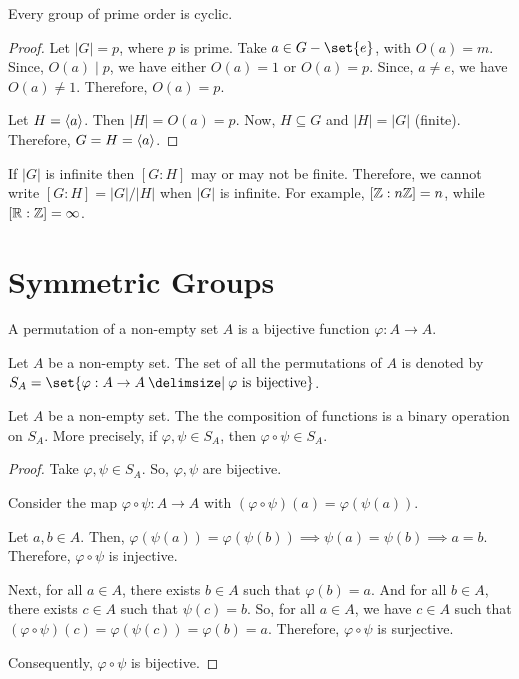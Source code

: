\documentclass[11pt]{penrose}
\begin{document}
\begin{ncor}
    Every group of prime order is cyclic.
\end{ncor}
\begin{proof}
    Let $|G| = p$, where $p$ is prime. Take $a \in G-\set{e}$, with $O(a) = m$. Since, $O(a) \mid p$, we have either $O(a) = 1$ or $O(a) = p$. Since, $a \neq e$, we have $O(a) \neq 1$. Therefore, $O(a) = p$.

    Let $H = \langle a\rangle$. Then $|H| = O(a) = p$. Now, $H \subseteq G$ and $|H| = |G|$ (finite). Therefore, $G = H = \langle a\rangle$.
\end{proof}

\begin{remark}
    If $|G|$ is infinite then $[G:H]$ may or may not be finite. Therefore, we cannot write $[G:H] = |G|/|H|$ when $|G|$ is infinite. For example, $[\mathbb{Z}:n\mathbb{Z}]=n$, while $[\mathbb{R}:\mathbb{Z}] = \infty$.
\end{remark}

\section{Symmetric Groups}

\begin{ndfn}
    A permutation of a non-empty set $A$ is a bijective function $\varphi: A \to A$.
\end{ndfn}

\begin{notation}
    Let $A$ be a non-empty set. The set of all the permutations of $A$ is denoted by $S_A = \set{\varphi: A \to A \st \varphi \text{ is bijective}}$.
\end{notation}

\begin{nlemma}\label{lemma:composition-binary}
    Let $A$ be a non-empty set. The the composition of functions is a binary operation on $S_A$. More precisely, if $\varphi, \psi \in S_A$, then $\varphi \circ \psi \in S_A$.
\end{nlemma}
\begin{proof}
    Take $\varphi, \psi \in S_A$. So, $\varphi, \psi$ are bijective.

    Consider the map $\varphi \circ \psi : A \to A$ with $(\varphi \circ \psi)(a) = \varphi(\psi(a))$.

    Let $a, b \in A$. Then, $\varphi(\psi(a)) = \varphi(\psi(b)) \implies \psi(a) = \psi(b) \implies a = b$. Therefore, $\varphi \circ \psi$ is injective.

    Next, for all $a \in A$, there exists $b \in A$ such that $\varphi(b) = a$. And for all $b \in A$, there exists $c \in A$ such that $\psi(c) = b$. So, for all $a \in A$, we have $c \in A$ such that $(\varphi \circ \psi)(c) = \varphi(\psi(c)) = \varphi(b) = a$. Therefore, $\varphi \circ \psi$ is surjective.

    Consequently, $\varphi \circ \psi$ is bijective.
\end{proof}
\end{document}
